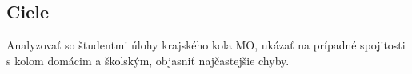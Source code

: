 
\subsection*{Ciele}
Analyzovať so študentmi úlohy krajského kola MO, ukázať na prípadné spojitosti s kolom domácim a školským, objasniť najčastejšie chyby.
